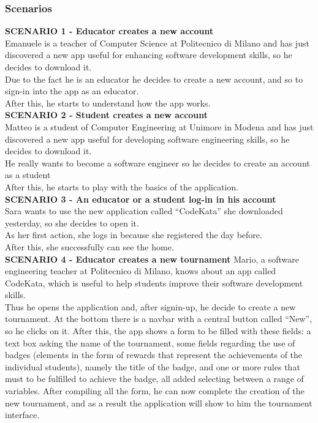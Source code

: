 \subsubsection{Scenarios}
\textbf{SCENARIO 1 - Educator creates a new account} \\
    Emanuele is a teacher of Computer Science at Politecnico di Milano and has just discovered a new app useful for enhancing software development skills, so he decides to download it. \\
    Due to the fact he is an educator he decides to create a new account, and so to sign-in into the app as an educator. \\
    After this, he starts to understand how the app works.\\
    
    \textbf{SCENARIO 2 - Student creates a new account} \\
    Matteo is a student of Computer Engineering at Unimore in Modena and has just discovered a new app useful for developing software engineering skills, so he decides to download it. \\
    He really wants to become a software engineer so he decides to create an account as a student \\
    After this, he starts to play with the basics of the application.\\

    \textbf{SCENARIO 3 - An educator or a student log-in in his account} \\
    Sara wants to use the new application called ``CodeKata'' she downloaded yesterday, so she decides to open it. \\
    As her first action, she logs in because she registered the day before. \\
    After this, she successfully can see the home.\\

    
    \textbf{SCENARIO 4 - Educator creates a new tournament}
    Mario, a software engineering teacher at Politecnico di Milano, knows about an app called CodeKata, which is useful to help students improve their software development skills. \\
    Thus he opens the application and, after signin-up, he decide to create a new tournament. 
    At the bottom there is a navbar with a central button called  ``New'', so he clicks on it. After this, the app shows a form to be filled with these fields: a text box asking the name of the tournament, some fields regarding the use of badges (elements in the form of rewards that represent the achievements of the individual students), namely the title of the badge, and one or more rules that must to be fulfilled to achieve the badge, all added selecting between a range of variables. 
    After compiling all the form, he can now complete the creation of the new tournament, and as a result the application will show to him the tournament interface.\\


